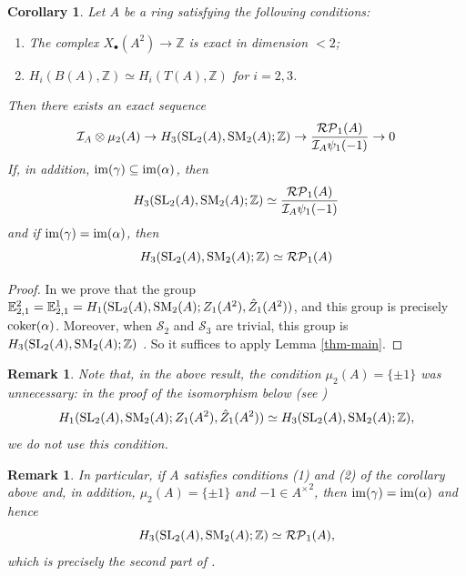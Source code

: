 \documentclass[11pt]{amsart}
\theoremstyle{definition}
\theoremstyle{plain}
\newtheorem{cor}[ntn]{Corollary}
\newtheorem{rem}[ntn]{Remark}
\numberwithin{equation}{section}
\newcommand{\z}{\mathbb{Z}}
\newcommand{\II}{\mathcal{I}}
\newcommand{\RP}{\mathcal{RP}}
\renewcommand{\SS}{\mathcal{S}}
\renewcommand{\aa}{{A^\times}}
\newcommand{\Eb}{\mathbb{E}}
\newcommand{\SL}{\mathit{{\rm SL}}}
\newcommand{\SM}{\mathit{{\rm SM}}}
\newcommand{\im}{{\rm im}}
\newcommand{\coker}{{\rm coker}}
\begin{document}
\begin{cor}
    Let $A$ be a ring satisfying the following conditions:
    \begin{enumerate}
        \item The complex $X_{\bullet}(A^2)\to\z$ is exact in dimension $<2$;
        \item $H_i(B(A),\z)\simeq H_i(T(A),\z)$ for $i=2,3$.
    \end{enumerate}
    Then there exists an exact sequence
    \[
        \II_A\otimes\mu_2(A)\to H_3(\SL_2(A),\SM_2(A);\z)\to \frac{\RP_1(A)}{\II_A\psi_1(-1)}\to 0
    \]
    If, in addition, $\im(\gamma)\subseteq\im(\alpha)$, then
    \[
        H_3(\SL_2(A),\SM_2(A);\z)\simeq\frac{\RP_1(A)}{\II_A\psi_1(-1)}
    \]
    and if $\im(\gamma)=\im(\alpha)$, then
    \[
        H_3(\SL_2(A),\SM_2(A);\z)\simeq\RP_1(A)
    \]
\end{cor}
\begin{proof}
    In \cite[\S 8]{B-E--2023} we prove that the group $\Eb^2_{2,1}=\Eb^1_{2,1}=H_1(\SL_2(A),\SM_2(A);Z_1(A^2),\hat{Z}_1(A^2))$, and this group is precisely $\coker(\alpha)$. Moreover, when $\SS_2$ and $\SS_3$ are trivial, this group is $H_3(\SL_2(A),\SM_2(A);\z)$ \cite[Proposition 8.1]{B-E--2023}. So it suffices to apply Lemma \ref{thm-main}.
\end{proof}
\begin{rem}
    Note that, in the above result, the condition $\mu_2(A)=\{\pm 1\}$ was unnecessary: in the proof of the isomorphism below (see \cite[Proposition 8.1]{B-E--2023})
    \[
        H_1(\SL_2(A),\SM_2(A);Z_1(A^2),\hat{Z}_1(A^2))\simeq H_3(\SL_2(A),\SM_2(A);\z),
    \]
    we do not use this condition. %
\end{rem}
\begin{rem}
    In particular, if $A$ satisfies conditions (1) and (2) of the corollary above and, in addition, $\mu_2(A)=\{\pm 1\}$ and $-1\in\aa^2$, then $\im(\gamma)=\im(\alpha)$ and hence
    \[
        H_3(\SL_2(A),\SM_2(A);\z)\simeq \RP_1(A),
    \]
    which is precisely the second part of \cite[Theorem 8.2]{B-E--2023}. 
\end{rem}
\end{document}
